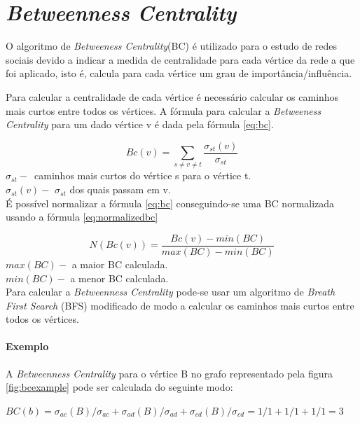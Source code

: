 \section{\textit{Betweenness Centrality}}

O algoritmo de \textit{Betweeness Centrality}(BC) é utilizado para o 
estudo de redes sociais devido a indicar a medida de centralidade para cada 
vértice da rede a que foi aplicado, isto é, calcula para cada vértice um grau de 
importância/influência. 

Para calcular a centralidade de cada vértice é necessário calcular os 
caminhos mais curtos entre todos os vértices. A fórmula para calcular a 
\textit{Betweeness Centrality} para um dado vértice v é dada pela fórmula 
\ref{eq:bc}.

\begin{equation}
	Bc(v) = \sum\limits_{s \neq v \neq t} 
\frac{\sigma_{st}(v)}{\sigma_{st}}
	\label{eq:bc}
\end{equation}
$\sigma_{st}-$~caminhos mais curtos do vértice s para o vértice t.\\
$\sigma_{st}(v)-$ $\sigma_{st}$ dos quais passam em v.\\

É possível normalizar a  fórmula \ref{eq:bc} conseguindo-se uma BC normalizada usando a fórmula 
\ref{eq:normalizedbc}

\begin{equation}
	N(Bc(v)) = \frac{Bc(v) - min(BC)}{max(BC)-min(BC)} 
	\label{eq:normalizedbc}
\end{equation}
$max(BC)-$ a maior BC calculada.\\
$min(BC)-$ a menor BC calculada.\\

Para calcular a \textit{Betweenness Centrality} pode-se usar um algoritmo de 
\textit{Breath First Search} (BFS) modificado de modo a calcular os caminhos 
mais curtos entre todos os vértices. 

\paragraph{Exemplo}
A \textit{Betweenness Centrality} para o vértice B no grafo representado pela 
figura \ref{fig:bcexample} pode ser calculada do seguinte modo:

\begin{math}
BC(b) = \sigma_{ac}(B)/\sigma_{ac} + \sigma_{ad}(B)/\sigma_{ad} + 
\sigma_{cd}(B)/\sigma_{cd} = 1/1 + 1/1 + 1/1 = 3
\end{math}


